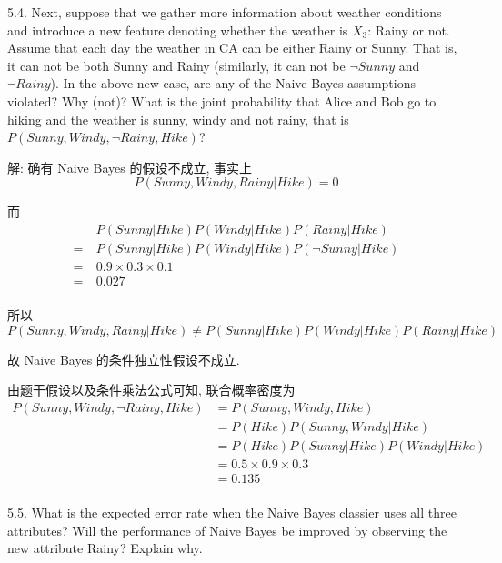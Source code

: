 \documentclass{article}
\begin{document}
5.4. Next, suppose that we gather more information about weather conditions and introduce a new feature denoting whether the weather is $X_3$: Rainy or not. Assume that each day the weather in CA can be either Rainy or Sunny. That is, it can not be both Sunny and Rainy (similarly, it can not be $\neg Sunny$ and $\neg Rainy$). In the above new case, are any of the Naive Bayes assumptions violated? Why (not)? What is the joint probability that Alice and Bob go to hiking and the weather is sunny, windy and not rainy, that is $P(Sunny,Windy,\neg Rainy,Hike)$?

解: 确有 Naive Bayes 的假设不成立, 事实上
\begin{equation}
  P(Sunny,Windy,Rainy|Hike)=0
\end{equation}

而
\begin{equation}
  \begin{aligned}
     &~P(Sunny|Hike)P(Windy|Hike)P(Rainy|Hike)\\
    =&~P(Sunny|Hike)P(Windy|Hike)P(\neg Sunny|Hike)\\
    =&~0.9\times0.3\times0.1\\
    =&~0.027\\
  \end{aligned}
\end{equation}

所以
\begin{equation}
  P(Sunny,Windy,Rainy|Hike)\neq P(Sunny|Hike)P(Windy|Hike)P(Rainy|Hike)
\end{equation}

故 Naive Bayes 的条件独立性假设不成立.

由题干假设以及条件乘法公式可知, 联合概率密度为
\begin{equation}
  \begin{aligned}
    P(Sunny,Windy,\neg Rainy,Hike)
    &=P(Sunny,Windy,Hike)\\
    &=P(Hike)P(Sunny,Windy|Hike)\\
    &=P(Hike)P(Sunny|Hike)P(Windy|Hike)\\
    &=0.5 \times 0.9 \times 0.3\\
    &=0.135\\
  \end{aligned}
\end{equation}


5.5. What is the expected error rate when the Naive Bayes classier uses all three attributes? Will the performance of Naive Bayes be improved by observing the new attribute Rainy? Explain why. 
\end{document}
